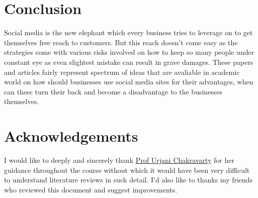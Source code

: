 \documentclass{article}
\begin{document}
\section{Conclusion}
Social media is the new elephant which every business tries to leverage on to get themselves free reach to customers. But this reach doesn't come easy as the strategies come with various risks involved on how to keep so many people under constant eye as even slightest mistake can result in grave damages. These papers and articles fairly represent spectrum of ideas that are avaliable in academic world on how should businesses use social media sites for their advantages, when can these turn their back and become a disadvantage to the businesses themselves.

\section*{Acknowledgements}
I would like to deeply and sincerely thank \href{https://www.iimidr.ac.in/faculty/full-time-faculty/profile/?id=92}{Prof Urjani Chakravarty} for her guidance throughout the course without which it would have been very difficult to understand literature reviews in such detail. I'd also like to thanks my friends who reviewed this document and suggest improvements.


\newpage
\end{document}
